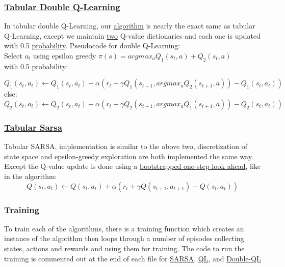 \documentclass[twoside,11pt]{article}
\begin{document}
\subsubsection{\href{https://github.com/duoduocai-dot/csc498-project/blob/main/tabular_double_Q_learning.py}{Tabular Double Q-Learning}}
In tabular double Q-Learning, our \href{https://github.com/duoduocai-dot/csc498-project/blob/main/tabular_double_Q_learning.py}{algorithm} is nearly the exact same as tabular Q-Learning, except we maintain \href{https://github.com/duoduocai-dot/csc498-project/blob/main/tabular_double_Q_learning.py#L40}{two} Q-value dictionaries and each one is updated with 0.5 \href{https://github.com/duoduocai-dot/csc498-project/blob/main/tabular_double_Q_learning.py#L91}{probability}.
Pseudocode for double Q-Learning:
\\
Select $a_t$ using epsilon greedy $\pi(s) = argmax_a Q_1(s_t, a)+Q_2(s_t, a)$ 
\\
with 0.5 probability:

\begin{equation}
Q_1(s_t,a_t) \leftarrow Q_1(s_t,a_t) + \alpha (r_t + \gamma Q_1(s_{t+1}, argmax_a Q_2(s_{t+1},a)) - Q_1(s_t,a_t))
\end{equation}
else:
\begin{equation}
Q_2(s_t,a_t) \leftarrow Q_2(s_t,a_t) + \alpha (r_t + \gamma Q_2(s_{t+1}, argmax_a Q_1(s_{t+1},a)) - Q_2(s_t,a_t))
\end{equation}

\subsubsection{\href{https://github.com/duoduocai-dot/csc498-project/blob/main/Sarsa.py}{Tabular Sarsa}}
Tabular SARSA, implementation is similar to the above two, discretization of state space and epsilon-greedy exploration are both implemented the same way. Except the Q-value update is done using a \href{https://github.com/duoduocai-dot/csc498-project/blob/main/Sarsa.py#L80}{bootstrapped one-step look ahead}, like in the algorithm:
\begin{equation}
Q(s_t,a_t) \leftarrow Q(s_t,a_t) + \alpha (r_t + \gamma Q(s_{t+1},a_{t+1}) - Q(s_t,a_t))
\end{equation}

\subsubsection{Training} 
To train each of the algorithms, there is a training function which creates an instance of the algorithm then loops through a number of episodes collecting states, actions and rewards and using them for training. The code to run the training is commented out at the end of each file for \href{https://github.com/duoduocai-dot/csc498-project/blob/main/Sarsa.py#L281}{SARSA}, \href{https://github.com/duoduocai-dot/csc498-project/blob/main/tabular_Q_learning.py#L307}{QL}, and \href{https://github.com/duoduocai-dot/csc498-project/blob/main/tabular_double_Q_learning.py#L326}{Double-QL}
\end{document}
